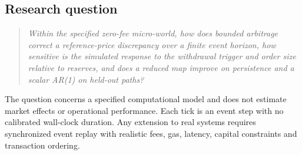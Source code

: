 \FloatBarrier
\begin{samepage}
\section{Research question}

\begin{quote}
\emph{Within the specified zero-fee micro-world, how does bounded arbitrage correct a reference-price discrepancy over a finite event horizon, how sensitive is the simulated response to the withdrawal trigger and order size relative to reserves, and does a reduced map improve on persistence and a scalar AR(1) on held-out paths?}
\end{quote}
\end{samepage}

The question concerns a specified computational model and does not estimate market effects or operational performance. Each tick is an event step with no calibrated wall-clock duration. Any extension to real systems requires synchronized event replay with realistic fees, gas, latency, capital constraints and transaction ordering.
